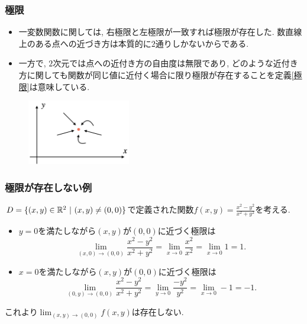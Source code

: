 

\begin{frame}
\frametitle{極限}


\begin{itemize}
\item 一変数関数に関しては, 右極限と左極限が一致すれば極限が存在した. 
数直線上のある点への近づき方は本質的に$2$通りしかないからである. 
\item 一方で, $2$次元では点への近付き方の自由度は無限であり, 
どのような近付き方に関しても関数が同じ値に近付く場合に限り極限が存在することを定義\ref{極限}は意味している. 
\end{itemize}

\vspace{-3mm}

\begin{figure}[htbp]
 \begin{center} 
  \includegraphics[width=45mm]{calculus10/limit2d.png}
 \end{center}
\end{figure}

\vspace{-3mm}

\end{frame}




\begin{frame}
\frametitle{極限が存在しない例}

$D=\{(x,y) \in \mathbb{R}^2 \ | \ (x,y) \ne (0,0)\}$で定義された関数$f(x,y)=\frac{x^2-y^2}{x^2+y^2}$を考える. 

\begin{itemize}
\item $y=0$を満たしながら$(x,y)$が$(0,0)$に近づく極限は
$$
\lim_{(x,0)\to (0,0)} \frac{x^2-y^2}{x^2+y^2} 
=\lim_{x\to 0} \frac{x^2}{x^2}  =\lim_{x\to 0} 1=1. 
$$
\item $x=0$を満たしながら$(x,y)$が$(0,0)$に近づく極限は
$$
\lim_{(0,y)\to (0,0)} \frac{x^2-y^2}{x^2+y^2} 
=\lim_{y\to 0} \frac{-y^2}{y^2}  =\lim_{x\to 0} -1=-1. 
$$
\end{itemize}
これより$\displaystyle \lim_{(x,y)\to (0,0)}f(x,y)$は存在しない. 
\end{frame}



